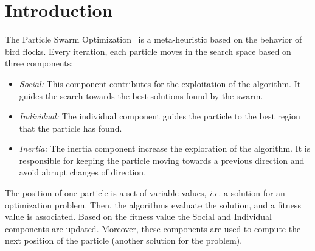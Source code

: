 \documentclass[conference]{IEEEtran}
\begin{document}




%
\IEEEpeerreviewmaketitle






    \section{Introduction}

    The Particle Swarm Optimization~\cite{PSO95} is a meta-heuristic based on the behavior of bird flocks. Every iteration, each particle moves in the search space based on three components:

    \begin{itemize}
        \item {\em Social:} This component contributes for the exploitation of the algorithm.
        It guides the search towards the best solutions found by the swarm.
        \item {\em Individual:} The individual component guides the particle to the best region that the particle has found.
        \item {\em Inertia:} The inertia component increase the exploration of the algorithm. It is responsible for keeping the particle moving towards a previous direction and avoid abrupt changes of direction.
    \end{itemize}

    The position of one particle is a set of variable values, {\em i.e.} a solution for an optimization problem. Then, the algorithms evaluate the solution, and a fitness value is associated. Based on the fitness value the Social and Individual components are updated.
    Moreover, these components are used to compute the next position of the particle (another solution for the problem).
\end{document}

